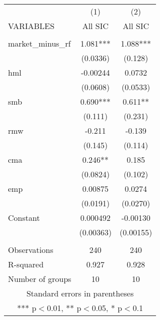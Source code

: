 \begin{tabular}{lcc} \hline
 & (1) & (2) \\
VARIABLES & All SIC & All SIC \\ \hline
 &  &  \\
market\_minus\_rf & 1.081*** & 1.088*** \\
 & (0.0336) & (0.128) \\
hml & -0.00244 & 0.0732 \\
 & (0.0608) & (0.0533) \\
smb & 0.690*** & 0.611** \\
 & (0.111) & (0.231) \\
rmw & -0.211 & -0.139 \\
 & (0.145) & (0.114) \\
cma & 0.246** & 0.185 \\
 & (0.0824) & (0.102) \\
emp & 0.00875 & 0.0274 \\
 & (0.0191) & (0.0270) \\
Constant & 0.000492 & -0.00130 \\
 & (0.00363) & (0.00155) \\
 &  &  \\
Observations & 240 & 240 \\
R-squared & 0.927 & 0.928 \\
 Number of groups & 10 & 10 \\ \hline
\multicolumn{3}{c}{ Standard errors in parentheses} \\
\multicolumn{3}{c}{ *** p$<$0.01, ** p$<$0.05, * p$<$0.1} \\
\end{tabular}
